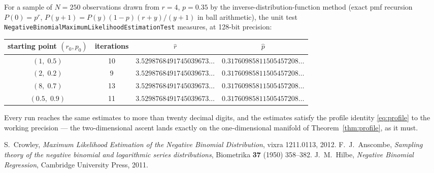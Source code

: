 \documentclass[11pt]{article}
\begin{document}
For a sample of $N=250$ observations drawn from $r=4$, $p=0.35$ by the
inverse-distribution-function method (exact pmf recursion
$P(0)=p^{r}$, $P(y{+}1)=P(y)(1-p)(r+y)/(y+1)$ in ball arithmetic), the unit
test \texttt{NegativeBinomialMaximumLikelihoodEstimationTest} measures, at
128-bit precision:

\begin{center}
\begin{tabular}{cccc}
starting point $(r_{0},p_{0})$ & iterations & $\hat r$ & $\hat p$\\
\hline
$(1,\;0.5)$ & 10 & $3.5298768491745039673\ldots$ & $0.31760985811505457208\ldots$\\
$(2,\;0.2)$ & 9  & $3.5298768491745039673\ldots$ & $0.31760985811505457208\ldots$\\
$(8,\;0.7)$ & 13 & $3.5298768491745039673\ldots$ & $0.31760985811505457208\ldots$\\
$(0.5,\;0.9)$ & 11 & $3.5298768491745039673\ldots$ & $0.31760985811505457208\ldots$\\
\end{tabular}
\end{center}

\noindent
Every run reaches the same estimates to more than twenty decimal digits, and
the estimates satisfy the profile identity \eqref{eq:profile} to the
working precision — the two-dimensional ascent lands exactly on the
one-dimensional manifold of Theorem~\ref{thm:profile}, as it must.

\begin{thebibliography}{9}
 S.~Crowley,
\emph{Maximum Likelihood Estimation of the Negative Binomial Distribution},
vixra 1211.0113, 2012.
 F.~J.~Anscombe,
\emph{Sampling theory of the negative binomial and logarithmic series
distributions}, Biometrika \textbf{37} (1950) 358--382.
 J.~M.~Hilbe,
\emph{Negative Binomial Regression}, Cambridge University Press, 2011.
\end{thebibliography}
\end{document}
